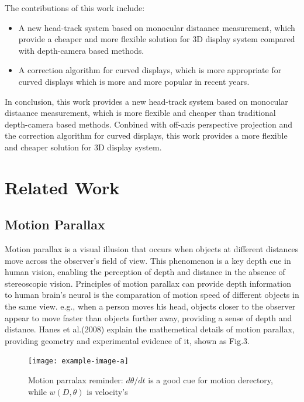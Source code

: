 The contributions of this work include:

\begin{itemize}
    \item A new head-track system based on monocular distaance measurement, which provide a cheaper and more flexible solution for 3D display system compared with depth-camera based methods.
    \item A correction algorithm for curved displays, which is more appropriate for curved displays which is more and more popular in recent years.
\end{itemize}

In conclusion, this work provides a new head-track system based on monocular distaance measurement, which is more flexible and cheaper than traditional depth-camera based methods. Conbined with off-axis perspective projection and the correction algorithm for curved displays, this work provides a more flexible and cheaper solution for 3D display system.


\section {Related Work}

\subsection {Motion Parallax}

Motion parallax is a visual illusion that occurs when objects at different distances move across the observer's field of view. This phenomenon is a key depth cue in human vision, enabling the perception of depth and distance in the absence of stereoscopic vision. Principles of motion parallax can provide depth information to human brain's neural is the comparation of motion speed of different objects in the same view. e.g., when a person moves his head, objects closer to the observer appear to move faster than objects further away, providing a sense of depth and distance. Hanes et al.(2008) explain the mathemetical details of motion parallax, providing geometry and experimental evidence of it\cite{Hanes2008}, shown as Fig.3.

\begin{figure}[htb]
    \centering
    \texttt{[image: example-image-a]}
    \caption{Motion parralax reminder: $d\theta / dt$ is a good cue for motion derectory, while $w(D, \theta)$ is velocity's\cite{Hanes2008}}\label{F:test-a}
\end{figure}

